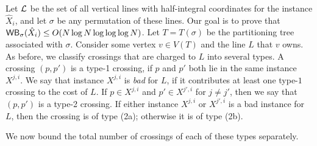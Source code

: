 \documentclass[11pt]{article}
\numberwithin{equation}{section}
\theoremstyle{definition}
\theoremstyle{plain}
\begin{document}
Let ${\mathcal L}$ be the set of all vertical lines with half-integral  coordinates for the instance $\hat X_i$, and let $\sigma$ be any permutation of these lines. Our goal is to prove that $\mathsf{WB}_{\sigma}(\hat X_i)\leq O(N\log N\log\log\log N)$. Let $T=T(\sigma)$ be the partitioning tree associated with $\sigma$. Consider some vertex $v\in V(T)$ and the line $L$ that $v$ owns. As before, we classify crossings that are charged to $L$ into several types. A crossing $(p,p')$ is a type-1 crossing, if $p$ and $p'$ both lie in the same instance $X^{j,i}$. We say that instance $X^{j,i}$ is \emph{bad} for $L$, if it contributes at least one type-$1$ crossing to the cost of $L$. If $p\in X^{j,i}$ and $p'\in X^{j',i}$ for $j\neq j'$, then we say that $(p,p')$ is a type-2 crossing. If either instance $X^{j,i}$ or $X^{j',i}$ is a bad instance for $L$, then the crossing is of type (2a); otherwise it is of type (2b). 

We now bound the total number of crossings of each of these types separately.
\end{document}
